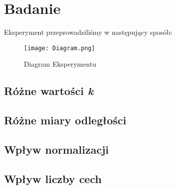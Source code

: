 \section{Badanie}

	Eksperyment przeprowadziliśmy w następujący sposób:
	
	\begin{figure}[h]
		\centering
		\texttt{[image: Diagram.png]}
		\captionsetup{justification=centering}
		\caption{Diagram Eksperymentu}
		\label{fig:1}
	\end{figure}

\subsection{Różne wartości \textit{k}}
	\blindtext

\subsection{Różne miary odległości}
	\blindtext

\subsection{Wpływ normalizacji}
	\blindtext

\subsection{Wpływ liczby cech}
	\blindtext